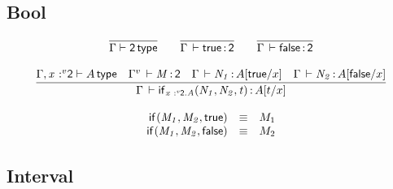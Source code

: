 \documentclass[11pt]{article}
\theoremstyle{plain}
\begin{document}


\subsection{Bool}

\[
\begin{array}{c}
\infer{\wftp{\Gamma}{\bool}}
      {}
\qquad
\infer{\oftp{\Gamma}{\dsd{true}}{\bool}}{}
\qquad
\infer{\oftp{\Gamma}{\dsd{false}}{\bool}}{}
\\ \\
\infer{\oftp{\Gamma}{\ite{\vstptm{x}{v}{\dsd{2}}.A}{N_1}{N_2}{t}}{\subst{A}{t}{x}}}
      {\wftp{\Gamma,\vstptm{x}{v}{\dsd{2}}}{A} &
        \oftp{\Gamma^v}{M}{\dsd{2}} &
        \oftp{\Gamma}{N_1}{\subst{A}{\dsd{true}}{x}} &
        \oftp{\Gamma}{N_2}{\subst{A}{\dsd{false}}{x}}
      }
\\ \\
\begin{array}{rcll}
\ite{}{M_1}{M_2}{\dsd{true}} & \equiv & M_1 \\
\ite{}{M_1}{M_2}{\dsd{false}} & \equiv & M_2 \\
\end{array} \\
\end{array}
\]

\subsection{Interval}
\end{document}
